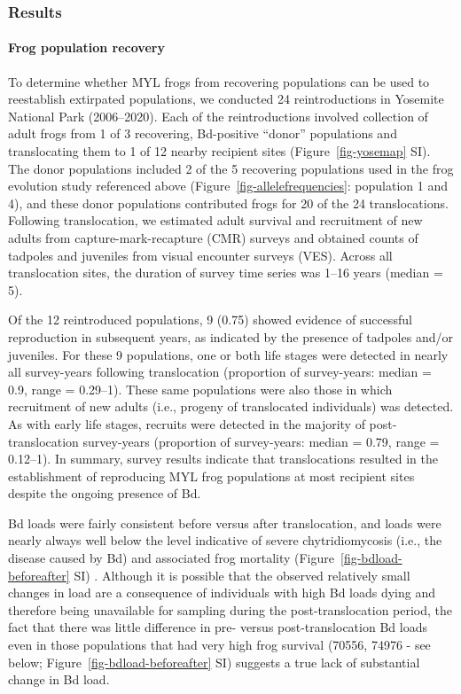 \documentclass[
  letterpaper,
  DIV=11,
  numbers=noendperiod]{scrartcl}
\let\oldparagraph\paragraph
\renewcommand{\paragraph}[1]{\oldparagraph{#1}\mbox{}}
\begin{document}
\hypertarget{results}{%
\subsubsection{Results}\label{results}}

\hypertarget{frog-population-recovery}{%
\paragraph{Frog population recovery}\label{frog-population-recovery}}

To determine whether MYL frogs from recovering populations can be used
to reestablish extirpated populations, we conducted 24 reintroductions
in Yosemite National Park (2006--2020). Each of the reintroductions
involved collection of adult frogs from 1 of 3 recovering, Bd-positive
``donor'' populations and translocating them to 1 of 12 nearby recipient
sites (Figure~\ref{fig-yosemap} SI). The donor populations included 2 of
the 5 recovering populations used in the frog evolution study referenced
above (Figure~\ref{fig-allelefrequencies}: population 1 and 4), and
these donor populations contributed frogs for 20 of the 24
translocations. Following translocation, we estimated adult survival and
recruitment of new adults from capture-mark-recapture (CMR) surveys and
obtained counts of tadpoles and juveniles from visual encounter surveys
(VES). Across all translocation sites, the duration of survey time
series was 1--16 years (median = 5).

Of the 12 reintroduced populations, 9 (0.75) showed evidence of
successful reproduction in subsequent years, as indicated by the
presence of tadpoles and/or juveniles. For these 9 populations, one or
both life stages were detected in nearly all survey-years following
translocation (proportion of survey-years: median = 0.9, range =
0.29--1). These same populations were also those in which recruitment of
new adults (i.e., progeny of translocated individuals) was detected. As
with early life stages, recruits were detected in the majority of
post-translocation survey-years (proportion of survey-years: median =
0.79, range = 0.12--1). In summary, survey results indicate that
translocations resulted in the establishment of reproducing MYL frog
populations at most recipient sites despite the ongoing presence of Bd.

Bd loads were fairly consistent before versus after translocation, and
loads were nearly always well below the level indicative of severe
chytridiomycosis (i.e., the disease caused by Bd) and associated frog
mortality (Figure~\ref{fig-bdload-beforeafter} SI)
\citep{joseph2018, vredenburg2010}. Although it is possible that the
observed relatively small changes in load are a consequence of
individuals with high Bd loads dying and therefore being unavailable for
sampling during the post-translocation period, the fact that there was
little difference in pre- versus post-translocation Bd loads even in
those populations that had very high frog survival (70556, 74976 - see
below; Figure~\ref{fig-bdload-beforeafter} SI) suggests a true lack of
substantial change in Bd load.
\end{document}
